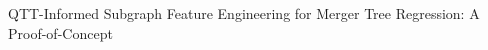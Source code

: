 \documentclass[twocolumn]{aastex631}
\begin{document}
QTT-Informed Subgraph Feature Engineering for Merger Tree Regression: A Proof-of-Concept
\end{document}
